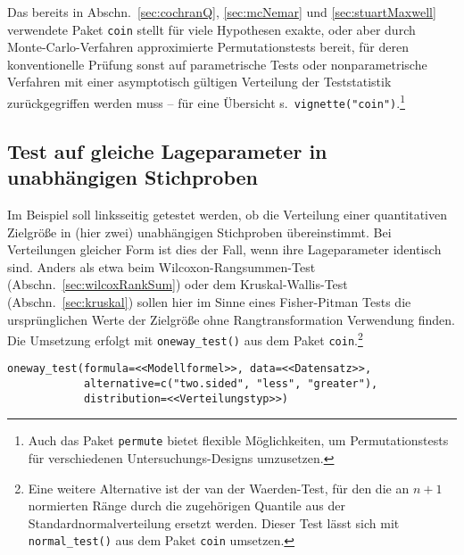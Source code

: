 Das bereits in Abschn.\ \ref{sec:cochranQ}, \ref{sec:mcNemar} und \ref{sec:stuartMaxwell} verwendete Paket \lstinline!coin! stellt für viele Hypothesen exakte, oder aber durch Monte-Carlo-Verfahren approximierte Permutationstests bereit, für deren konventionelle Prüfung sonst auf parametrische Tests oder nonparametrische Verfahren mit einer asymptotisch gültigen Verteilung der Teststatistik zurückgegriffen werden muss -- für eine Übersicht s.\ \lstinline!vignette("coin")!.\footnote{Auch das Paket \lstinline!permute! \cite{Simpson2011} bietet flexible Möglichkeiten, um Permutationstests für verschiedenen Untersuchungs-Designs umzusetzen.}

\subsection{Test auf gleiche Lageparameter in unabhängigen Stichproben}
\label{sec:permKInd}

Im Beispiel soll linksseitig getestet werden, ob die Verteilung einer quantitativen Zielgröße in (hier zwei) unabhängigen Stichproben übereinstimmt. Bei Verteilungen gleicher Form ist dies der Fall, wenn ihre Lageparameter identisch sind. Anders als etwa beim Wilcoxon-Rangsummen-Test (Abschn.\ \ref{sec:wilcoxRankSum}) oder dem Kruskal-Wallis-Test (Abschn.\ \ref{sec:kruskal}) sollen hier im Sinne eines Fisher-Pitman Tests die ursprünglichen Werte der Zielgröße ohne Rangtransformation Verwendung finden. Die Umsetzung erfolgt mit \lstinline!oneway_test()! aus dem Paket \lstinline!coin!.\footnote{\label{ftn:vdWaerden} Eine weitere Alternative ist der van der Waerden-Test, für den die an $n+1$ normierten Ränge durch die zugehörigen Quantile aus der Standardnormalverteilung ersetzt werden. Dieser Test lässt sich mit  \lstinline!normal_test()! aus dem Paket  \lstinline!coin! umsetzen.}
\begin{lstlisting}
oneway_test(formula=<<Modellformel>>, data=<<Datensatz>>,
            alternative=c("two.sided", "less", "greater"),
            distribution=<<Verteilungstyp>>)
\end{lstlisting}

